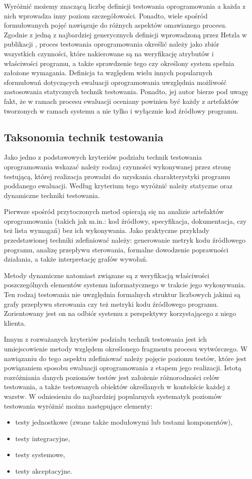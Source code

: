 Wyróżnić możemy znaczącą liczbę definicji testowania oprogramowania a każda z nich wprowadza inny poziom szczegółowości. Ponadto, wiele spośród formułowanych pojęć nawiązuje do różnych aspektów omawianego procesu. Zgodnie z jedną z najbardziej generycznych definicji wprowadzoną przez Hetzla w publikacji \cite{hetzel}, proces testowania oprogramowania określić należy jako zbiór wszystkich czynności, które nakierowane są na weryfikację atrybutów i właściwości programu, a także sprawdzenie tego czy określony system spełnia założone wymagania. Definicja ta względem wielu innych popularnych sformułowań dotyczących ewaluacji oprogramowania uwzględnia możliwość zastosowania statycznych technik testowania. Ponadto, jej autor bierze pod uwagę fakt, że w ramach procesu ewaluacji oceniany powinien być każdy z artefaktów tworzonych w ramach systemu a nie tylko i wyłącznie kod źródłowy programu.
\subsection*{Taksonomia technik testowania}
Jako jedno z podstawowych kryteriów podziału technik testowania oprogramowania wskazać należy rodzaj czynności wykonywanej przez stronę testującą, której realizacja prowadzi do uzyskania charakterystyki programu poddanego ewaluacji. Według kryterium tego wyróżnić należy statyczne oraz dynamiczne techniki testowania.

Pierwsze spośród przytoczonych metod opierają się na analizie artefaktów oprogramowania (takich jak m.in.: kod źródłowy, specyfikacja, dokumentacja, czy też lista wymagań) bez ich wykonywania. Jako praktyczne przykłady przedstawionej techniki zdefiniować należy: generowanie metryk kodu źródłowego programu, analizę przepływu sterowania, formalne dowodzenie poprawności działania, a także interpretację grafów wywołań.

Metody dynamiczne natomiast związane są z weryfikacją właściwości poszczególnych elementów systemu informatycznego w trakcie jego wykonywania. Ten rodzaj testowania nie uwzględnia formalnych struktur liczbowych jakimi są grafy przepływu sterowania czy też metryki kodu źródłowego programu. Zorientowany jest on na odbiór systemu z perspektywy korzystającego z niego klienta.

Innym z rozważanych kryteriów podziału technik testowania jest ich umiejscowienie metody względem określonego fragmentu procesu wytwórczego. W nawiązaniu do tego aspektu zdefiniować należy pojęcie poziomu testów, które jest powiązaniem sposobu ewaluacji oprogramowania z etapem jego realizacji. Istotą rozróżniania danych poziomów testów jest założenie różnorodności celów testowania, a także testowanych obiektów określanych w kontekście każdej z warstw. W odniesieniu do najbardziej popularnych systematyk poziomów testowania wyróżnić można następujące elementy:
\begin{itemize}
    \item testy jednostkowe (zwane także modułowymi lub testami komponentów),
    \item testy integracyjne,
    \item testy systemowe,
    \item testy akceptacyjne.
\end{itemize}

